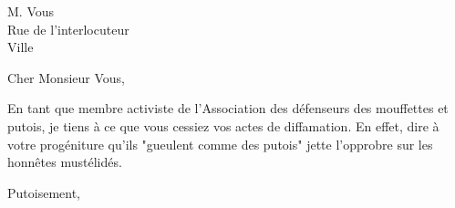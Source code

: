 \documentclass[11pt, a4paper]{lettre}
\begin{document}
\begin{letter}{ M. Vous \\ Rue de l'interlocuteur \\ Ville }

	\address{M. Furet\\ Pas de "Mr" en français \\Ville}
	\nofax
	
	
	\opening{Cher Monsieur Vous,}
	
	En tant que membre activiste de l'Association des défenseurs des mouffettes et putois, je tiens à ce que vous cessiez vos actes de diffamation.
	En effet, dire à votre progéniture qu'ils "gueulent comme des putois" jette l'opprobre sur les honnêtes mustélidés.
	
	\closing{Putoisement,}
\end{letter}
\end{document}
